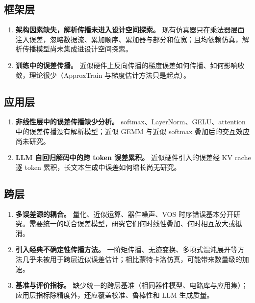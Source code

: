 \documentclass[11pt,a4paper]{ctexart}
\begin{document}
\subsection{框架层}
\begin{enumerate}[leftmargin=*,label=\textbf{\arabic*.},resume]
  \item \textbf{架构因素缺失，解析传播未进入设计空间探索。} 现有仿真器只在乘法器层面注入误差，忽略数据流、累加顺序、累加器与部分和位宽；且均依赖仿真，解析传播模型尚未集成进设计空间探索。
  \item \textbf{训练中的误差传播。} 近似硬件上反向传播的梯度误差如何传播、如何影响收敛，理论很少（ApproxTrain 与梯度估计方法只是起点）。
\end{enumerate}

\subsection{应用层}
\begin{enumerate}[leftmargin=*,label=\textbf{\arabic*.},resume]
  \item \textbf{非线性层中的误差传播缺少分析。} softmax、LayerNorm、GELU、attention 中的误差传播没有解析模型；近似 GEMM 与近似 softmax 叠加后的交互效应尚未研究。
  \item \textbf{LLM 自回归解码中的跨 token 误差累积。} 近似硬件引入的误差经 KV cache 逐 token 累积，长文本生成中误差如何增长尚无研究。
\end{enumerate}

\subsection{跨层}
\begin{enumerate}[leftmargin=*,label=\textbf{\arabic*.},resume]
  \item \textbf{多误差源的耦合。} 量化、近似运算、器件噪声、VOS 时序错误基本分开研究。需要统一的联合误差模型，研究它们何时线性叠加、何时相互放大或抵消。
  \item \textbf{引入经典不确定性传播方法。} 一阶矩传播、无迹变换、多项式混沌展开等方法几乎未被用于跨层近似误差估计；相比蒙特卡洛仿真，可能带来数量级的加速。
  \item \textbf{基准与评价指标。} 缺少统一的跨层基准（相同器件模型、电路库与应用集）；应用层指标除精度外，还应覆盖校准、鲁棒性和 LLM 生成质量。
\end{enumerate}
\end{document}
